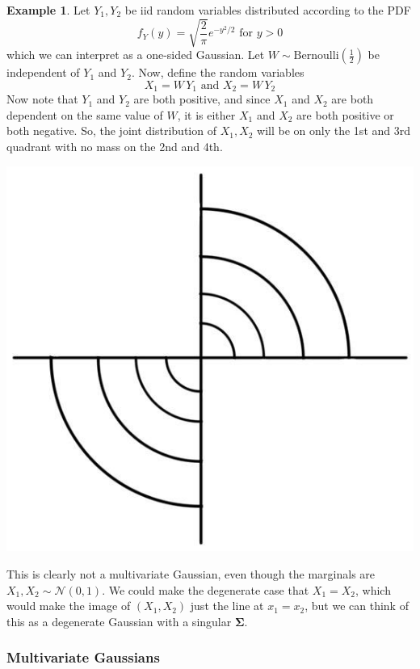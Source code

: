 \documentclass{article}
\theoremstyle{definition}
\newtheorem{example}{Example}[section]
\theoremstyle{remark}
\theoremstyle{definition}
\begin{document}
\begin{example}
Let $Y_1, Y_2$ be iid random variables distributed according to the PDF 
\[f_Y (y) = \sqrt{\frac{2}{\pi}} e^{-y^2 / 2} \text{ for } y > 0\]
which we can interpret as a one-sided Gaussian. Let $W \sim \mathrm{Bernoulli}(\frac{1}{2})$ be independent of $Y_1$ and $Y_2$. Now, define the random variables 
\[X_1 = W \, Y_1 \text{ and } X_2 = W \, Y_2\]
Now note that $Y_1$ and $Y_2$ are both positive, and since $X_1$ and $X_2$ are both dependent on the same value of $W$, it is either $X_1$ and $X_2$ are both positive or both negative. So, the joint distribution of $X_1, X_2$ will be on only the 1st and 3rd quadrant with no mass on the 2nd and 4th. 
\begin{center}
    \includegraphics[scale=0.23]{img/not_multi_Gaussian.jpg}
\end{center}
This is clearly not a multivariate Gaussian, even though the marginals are $X_1, X_2 \sim \mathcal{N}(0, 1)$. We could make the degenerate case that $X_1 = X_2$, which would make the image of $(X_1, X_2)$ just the line at $x_1 = x_2$, but we can think of this as a degenerate Gaussian with a singular $\boldsymbol{\Sigma}$. 
\end{example}

\subsubsection{Multivariate Gaussians}
\end{document}
